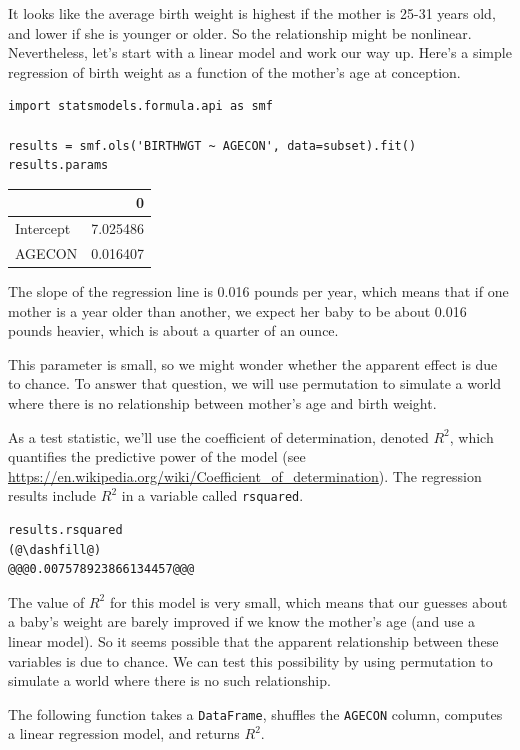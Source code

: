 It looks like the average birth weight is highest if the mother is 25-31
years old, and lower if she is younger or older. So the relationship
might be nonlinear. Nevertheless, let's start with a linear model and
work our way up. Here's a simple regression of birth weight as a
function of the mother's age at conception.

\begin{lstlisting}[]
import statsmodels.formula.api as smf

results = smf.ols('BIRTHWGT ~ AGECON', data=subset).fit()
results.params
\end{lstlisting}

\begin{tabular}{lr}
\midrule
{} &         0 \\
\midrule
Intercept &  7.025486 \\
AGECON    &  0.016407 \\
\midrule
\end{tabular}

The slope of the regression line is 0.016 pounds per year, which means
that if one mother is a year older than another, we expect her baby to
be about 0.016 pounds heavier, which is about a quarter of an ounce.

This parameter is small, so we might wonder whether the apparent effect
is due to chance. To answer that question, we will use permutation to
simulate a world where there is no relationship between mother's age and
birth weight.

As a test statistic, we'll use the coefficient of determination, denoted
\(R^2\), which quantifies the predictive power of the model (see
\url{https://en.wikipedia.org/wiki/Coefficient_of_determination}). The
regression results include \(R^2\) in a variable called
\passthrough{\lstinline!rsquared!}.

\begin{lstlisting}[]
results.rsquared
(@\dashfill@)
@@@0.007578923866134457@@@
\end{lstlisting}

The value of \(R^2\) for this model is very small, which means that our
guesses about a baby's weight are barely improved if we know the
mother's age (and use a linear model). So it seems possible that the
apparent relationship between these variables is due to chance. We can
test this possibility by using permutation to simulate a world where
there is no such relationship.

The following function takes a \passthrough{\lstinline!DataFrame!},
shuffles the \passthrough{\lstinline!AGECON!} column, computes a linear
regression model, and returns \(R^2\).

